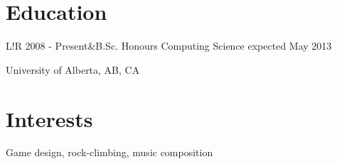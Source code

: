 \documentclass[10pt]{article}
\newcommand\VRule{\color{lightgray}\vrule width 0.5pt}
\begin{document}
\section*{Education}
\begin{tabular}{L!{\VRule}R}
2008 - Present&B.Sc. Honours Computing Science expected May 2013

University of Alberta, AB, CA\\
\end{tabular}

\section*{Interests}
Game design, rock-climbing, music composition
\end{document}
